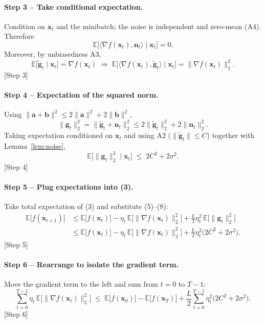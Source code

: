\documentclass{article}
\begin{document}
\paragraph{Step 3 – Take conditional expectation.}
Condition on $\mathbf{x}_t$ and the minibatch; the noise is independent and zero‑mean (A4). Therefore
\[
\mathbb{E}\!\bigl[\langle\nabla f(\mathbf{x}_t),\mathbf{n}_t\rangle\mid\mathbf{x}_t\bigr]=0.
\tag{5}
\]
Moreover, by unbiasedness A3,
\[
\mathbb{E}\!\bigl[\tilde{\mathbf{g}}_t\mid\mathbf{x}_t\bigr]=\nabla f(\mathbf{x}_t)
\;\Longrightarrow\;
\mathbb{E}\!\bigl[\langle\nabla f(\mathbf{x}_t),\tilde{\mathbf{g}}_t\rangle\mid\mathbf{x}_t\bigr]
= \|\nabla f(\mathbf{x}_t)\|_2^{2}.
\tag{6}
\]
[Step 3]

\paragraph{Step 4 – Expectation of the squared norm.}
Using $\|\mathbf{a}+\mathbf{b}\|^{2}\le 2\|\mathbf{a}\|^{2}+2\|\mathbf{b}\|^{2}$,
\[
\|\mathbf{g}_t\|_2^{2}
 = \|\tilde{\mathbf{g}}_t+\mathbf{n}_t\|_2^{2}
 \le 2\|\tilde{\mathbf{g}}_t\|_2^{2}+2\|\mathbf{n}_t\|_2^{2}.
\tag{7}
\]
Taking expectation conditioned on $\mathbf{x}_t$ and using A2 ($\|\tilde{\mathbf{g}}_t\|\le C$) together with Lemma~\ref{lem:noise},
\[
\mathbb{E}\!\bigl[\|\mathbf{g}_t\|_2^{2}\mid\mathbf{x}_t\bigr]
\;\le\; 2C^{2}+2\sigma^{2}.
\tag{8}
\]
[Step 4]

\paragraph{Step 5 – Plug expectations into (3).}
Take total expectation of (3) and substitute (5)–(8):
\[
\begin{aligned}
\mathbb{E}\!\bigl[f(\mathbf{x}_{t+1})\bigr]
&\le \mathbb{E}\!\bigl[f(\mathbf{x}_t)\bigr]
   -\eta_t\,\mathbb{E}\!\bigl[\|\nabla f(\mathbf{x}_t)\|_2^{2}\bigr]
   +\frac{L}{2}\eta_t^{2}\,\mathbb{E}\!\bigl[\|\mathbf{g}_t\|_2^{2}\bigr]
\\[4pt]
&\le \mathbb{E}\!\bigl[f(\mathbf{x}_t)\bigr]
   -\eta_t\,\mathbb{E}\!\bigl[\|\nabla f(\mathbf{x}_t)\|_2^{2}\bigr]
   +\frac{L}{2}\eta_t^{2}\bigl(2C^{2}+2\sigma^{2}\bigr).
\end{aligned}
\tag{9}
\]
[Step 5]

\paragraph{Step 6 – Rearrange to isolate the gradient term.}
Move the gradient term to the left and sum from $t=0$ to $T-1$:
\[
\sum_{t=0}^{T-1}\eta_t\,
\mathbb{E}\!\bigl[\|\nabla f(\mathbf{x}_t)\|_2^{2}\bigr]
\;\le\;
\mathbb{E}\!\bigl[f(\mathbf{x}_0)\bigr]-\mathbb{E}\!\bigl[f(\mathbf{x}_T)\bigr]
   +\frac{L}{2}\sum_{t=0}^{T-1}\eta_t^{2}\bigl(2C^{2}+2\sigma^{2}\bigr).
\tag{10}
\]
[Step 6]
\end{document}

